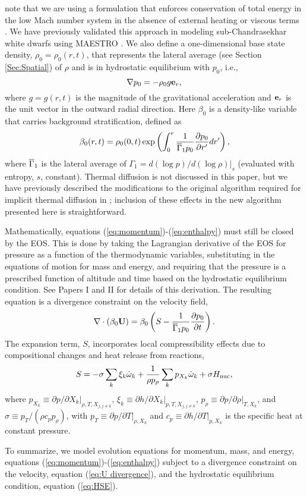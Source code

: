 note that we are using a formulation that enforces conservation of total energy in the
low Mach number system in the absence of external heating or viscous terms \citep{kleinpauluis,Vasil2013}.
We have previously validated this approach in modeling sub-Chandrasekhar white dwarfs using MAESTRO \citep{subChandra_II}.
We also define a one-dimensional base state density, $\rho_0 = \rho_0(r,t)$, that represents the lateral average (see Section \ref{Sec:Spatial}) of $\rho$ and is in hydrostatic equilibrium with $p_0$, i.e.,
\begin{equation}
\nabla p_0 = -\rho_0 g\eb_r, \label{eq:HSE}
\end{equation}
where $g=g(r,t)$ is the magnitude of the gravitational acceleration and ${\bf{e}}_r$ is the unit vector in the outward radial direction.
Here $\beta_0$ is a density-like variable that carries background stratification, defined as
\begin{equation}
\beta_0(r,t) = \rho_0(0,t)\exp\left(\int_0^r\frac{1}{\gammaonebar p_0}\frac{\partial p_0}{\partial r'}dr'\right),
\end{equation}
where $\overline{\Gamma}_1$ is the lateral average of $\Gamma_1 = d(\log p)/d(\log\rho) |_s$ (evaluated with entropy, $s$, constant).
Thermal diffusion is not discussed in this paper, but we have previously described the modifications to the original algorithm required
for implicit thermal diffusion in \cite{XRB_I}; inclusion of these effects in the new algorithm presented here is straightforward.

Mathematically, equations (\ref{eq:momentum})-(\ref{eq:enthalpy}) must still be closed by the EOS.
This is done by taking the Lagrangian derivative of the EOS for pressure as a function of the thermodynamic variables,
substituting in the equations of motion for mass and energy,
and requiring that the pressure is a prescribed function of altitude and time based on the hydrostatic equilibrium condition.
See Papers I and II for details of this derivation.
The resulting equation is a divergence constraint on the velocity field,
\begin{equation}
\nabla\cdot(\beta_0\Ub) = \beta_0\left(S - \frac{1}{\gammaonebar p_0}\frac{\partial p_0}{\partial t}\right).\label{eq:U divergence}
\end{equation}
The expansion term, $S$, incorporates local compressibility effects due to compositional changes and heat release from reactions,
\begin{equation}
S = -\sigma\sum_k\xi_k\omegadot_k + \frac{1}{\rho p_\rho}\sum_k p_{X_k}\omegadot_k + \sigma\Hnuc,\label{eq:S}
\end{equation}
where
$p_{X_k} \equiv \left. \partial p / \partial X_k \right|_{\rho,T,X_{j,j\ne k}}$,
$\xi_k \equiv \left. \partial h /\partial X_k \right |_{p,T,X_{j,j\ne k}}$,
$p_\rho \equiv \left.\partial p/\partial \rho \right |_{T, X_k}$, and
$\sigma \equiv p_T/(\rho c_p p_\rho)$, with $p_T \equiv \left. \partial p / \partial
T \right|_{\rho, X_k}$ and $c_p \equiv \left.  \partial h / \partial T
\right|_{p,X_k}$ is the specific heat at constant pressure.

To summarize, we model evolution equations for momentum, mass, and energy, equations (\ref{eq:momentum})-(\ref{eq:enthalpy}) subject to a divergence constraint on the velocity, equation (\ref{eq:U divergence}), and the hydrostatic equilibrium condition, equation (\ref{eq:HSE}).
